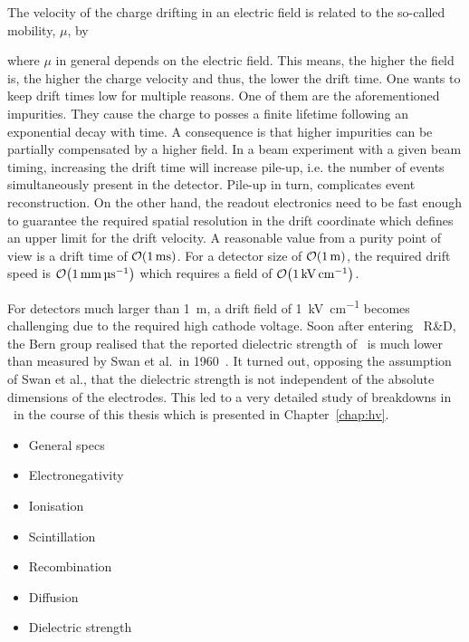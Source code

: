 The velocity of the charge drifting in an electric field is related to the so-called mobility, $\mu$, by


where $\mu$ in general depends on the electric field.
This means, the higher the field is, the higher the charge velocity and thus, the lower the drift time.
One wants to keep drift times low for multiple reasons.
One of them are the aforementioned impurities.
They cause the charge to posses a finite lifetime following an exponential decay with time.
A consequence is that higher impurities can be partially compensated by a higher field.
In a beam experiment with a given beam timing, increasing the drift time will increase pile-up, i.e. the number of events simultaneously present in the detector.
Pile-up in turn, complicates event reconstruction.
On the other hand, the readout electronics need to be fast enough to guarantee the required spatial resolution in the drift coordinate which defines an upper limit for the drift velocity.
A reasonable value from a purity point of view is a drift time of $\order{\SI{1}{\milli\second}}$.
For a detector size of $\order{\SI{1}{\metre}}$, the required drift speed is $\order{\SI{1}{\milli\metre\per\micro\second}}$ which requires a field of $\order{\SI{1}{\kilo\volt\per\centi\metre}}$.

For detectors much larger than \SI{1}{\metre}, a drift field of \SI{1}{\kilo\volt\per\centi\metre} becomes challenging due to the required high cathode voltage.
Soon after entering \lartpc\ R\&D, the Bern group realised that the reported dielectric strength of \lar\ is much lower~\cite{breakdown_14} than measured by Swan et al.\ in 1960~\cite{swan1, swan2}.
It turned out, opposing the assumption of Swan et al., that the dielectric strength is not independent of the absolute dimensions of the electrodes.
This led to a very detailed study of breakdowns in \lar\ in the course of this thesis which is presented in Chapter~\ref{chap:hv}.


\begin{itemize}
	\item General specs
	\item Electronegativity
	\item Ionisation
	\item Scintillation
	\item Recombination
	\item Diffusion
	\item Dielectric strength
\end{itemize}
\cite{NobleGasDetectors}


